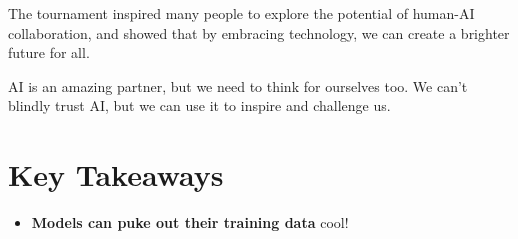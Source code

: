The tournament inspired many people to explore the potential of human-AI collaboration, and showed that by embracing technology, we can create a brighter future for all.

AI is an amazing partner, but we need to think for ourselves too. We can't blindly trust AI, but we can use it to inspire and challenge us.

\section{Key Takeaways}

\begin{itemize}
    \item \textbf{Models can puke out their training data} cool!
\end{itemize}

